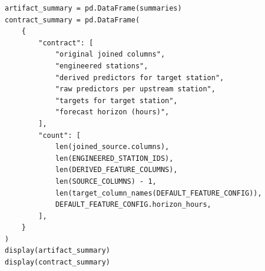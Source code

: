 \begin{verbatim}
artifact_summary = pd.DataFrame(summaries)
contract_summary = pd.DataFrame(
    {
        "contract": [
            "original joined columns",
            "engineered stations",
            "derived predictors for target station",
            "raw predictors per upstream station",
            "targets for target station",
            "forecast horizon (hours)",
        ],
        "count": [
            len(joined_source.columns),
            len(ENGINEERED_STATION_IDS),
            len(DERIVED_FEATURE_COLUMNS),
            len(SOURCE_COLUMNS) - 1,
            len(target_column_names(DEFAULT_FEATURE_CONFIG)),
            DEFAULT_FEATURE_CONFIG.horizon_hours,
        ],
    }
)
display(artifact_summary)
display(contract_summary)
\end{verbatim}
